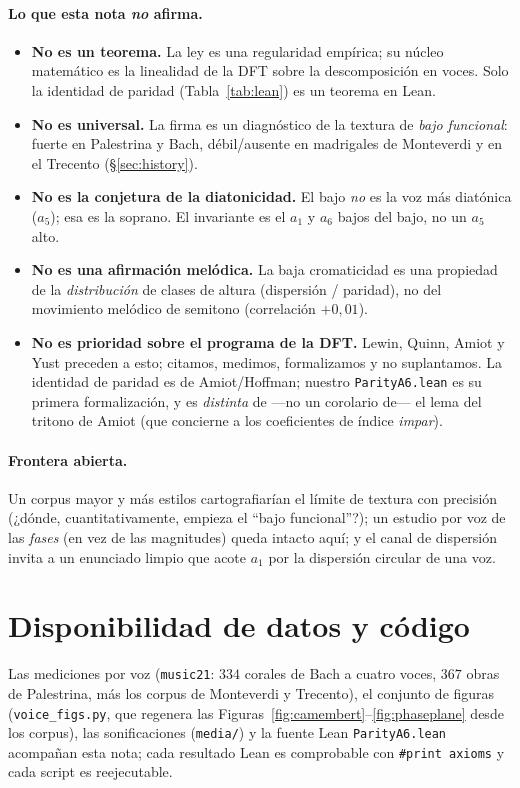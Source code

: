 \documentclass[11pt]{article}
\newcommand{\lean}[1]{\texttt{#1}}
\begin{document}
\paragraph{Lo que esta nota \emph{no} afirma.}
\begin{itemize}\itemsep2pt
  \item \textbf{No es un teorema.} La ley es una regularidad empírica; su núcleo matemático es la
        linealidad de la DFT sobre la descomposición en voces. Solo la identidad de paridad
        (Tabla~\ref{tab:lean}) es un teorema en Lean.
  \item \textbf{No es universal.} La firma es un diagnóstico de la textura de \emph{bajo funcional}: fuerte
        en Palestrina y Bach, débil/ausente en madrigales de Monteverdi y en el Trecento
        (\S\ref{sec:history}).
  \item \textbf{No es la conjetura de la diatonicidad.} El bajo \emph{no} es la voz más diatónica ($a_5$);
        esa es la soprano. El invariante es el $a_1$ y $a_6$ bajos del bajo, no un $a_5$ alto.
  \item \textbf{No es una afirmación melódica.} La baja cromaticidad es una propiedad de la
        \emph{distribución} de clases de altura (dispersión / paridad), no del movimiento melódico de
        semitono (correlación $+0{,}01$).
  \item \textbf{No es prioridad sobre el programa de la DFT.} Lewin, Quinn, Amiot y Yust preceden a esto;
        citamos, medimos, formalizamos y no suplantamos. La identidad de paridad es de Amiot/Hoffman;
        nuestro \lean{ParityA6.lean} es su primera formalización, y es \emph{distinta} de ---no un corolario
        de--- el lema del tritono de Amiot (que concierne a los coeficientes de índice \emph{impar}).
\end{itemize}

\paragraph{Frontera abierta.} Un corpus mayor y más estilos cartografiarían el límite de textura con
precisión (¿dónde, cuantitativamente, empieza el ``bajo funcional''?); un estudio por voz de las
\emph{fases} (en vez de las magnitudes) queda intacto aquí; y el canal de dispersión invita a un enunciado
limpio que acote $a_1$ por la dispersión circular de una voz.

\section*{Disponibilidad de datos y código}
Las mediciones por voz (\lean{music21}: $334$ corales de Bach a cuatro voces, $367$ obras de Palestrina,
más los corpus de Monteverdi y Trecento), el conjunto de figuras (\lean{voice\_figs.py}, que regenera las
Figuras~\ref{fig:camembert}--\ref{fig:phaseplane} desde los corpus), las sonificaciones
(\lean{media/}) y la fuente Lean \lean{ParityA6.lean} acompañan esta nota; cada resultado Lean es
comprobable con \lean{\#print axioms} y cada script es reejecutable.
\end{document}

